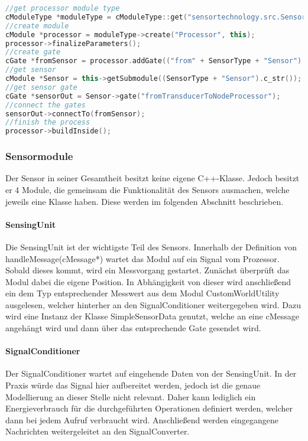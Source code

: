 \begin{lstlisting}[language=C++, label=lst:initProc, caption=teilweise Initialisierung des Prozessors]
//get processor module type
cModuleType *moduleType = cModuleType::get("sensortechnology.src.SensorNode.Processor.Processor");
//create module
cModule *processor = moduleType->create("Processor", this);
processor->finalizeParameters();
//create gate
cGate *fromSensor = processor.addGate(("from" + SensorType + "Sensor").c_str(), cGate::INPUT);
//get sensor
cModule *Sensor = this->getSubmodule((SensorType + "Sensor").c_str());
//get sensor gate
cGate *sensorOut = Sensor->gate("fromTransducerToNodeProcessor");    
//connect the gates
sensorOut->connectTo(fromSensor);    
//finish the process
processor->buildInside();
\end{lstlisting}

\subsubsection{Sensormodule}

Der Sensor in seiner Gesamtheit besitzt keine eigene C++-Klasse. Jedoch besitzt er 4 Module, die gemeinsam die Funktionalität des Sensors ausmachen, welche jeweils eine Klasse haben. Diese werden im folgenden Abschnitt beschrieben.

\paragraph{SensingUnit}

Die SensingUnit ist der wichtigste Teil des Sensors. Innerhalb der Definition von handleMessage(cMessage*) wartet das Modul auf ein Signal vom Prozessor. Sobald dieses kommt, wird ein Messvorgang gestartet. Zunächst überprüft das Modul dabei die eigene Position. In Abhängigkeit von dieser wird anschließend ein dem Typ entsprechender Messwert aus dem Modul CustomWorldUtility ausgelesen, welcher hinterher an den SignalConditioner weitergegeben wird. Dazu wird eine Instanz der Klasse SimpleSensorData genutzt, welche an eine cMessage angehängt wird und dann über das entsprechende Gate gesendet wird.

\paragraph{SignalConditioner}

Der SignalConditioner wartet auf eingehende Daten von der SensingUnit. In der Praxis würde das Signal hier aufbereitet werden, jedoch ist die genaue Modellierung an dieser Stelle nicht relevant. Daher kann lediglich ein Energieverbrauch für die durchgeführten Operationen definiert werden, welcher dann bei jedem Aufruf verbraucht wird. Anschließend werden eingegangene Nachrichten weitergeleitet an den SignalConverter.

